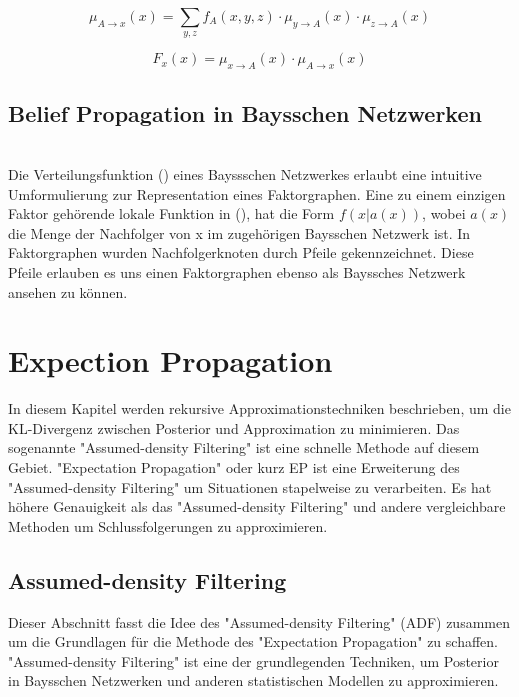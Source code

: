 \documentclass[12pt,a4paper]{scrartcl}
\numberwithin{equation}{section}
\begin{document}
\begin{equation}
 \mu_{A \rightarrow x}(x) = \sum_{y,z} f_A(x,y,z) \cdot \mu_{y \rightarrow A}(x) \cdot \mu_{z \rightarrow A}(x)
\end{equation}

\begin{equation}
 F_x(x) = \mu_{x \rightarrow A}(x) \cdot \mu_{A \rightarrow x}(x)
\end{equation}

\subsection{Belief Propagation in Baysschen Netzwerken}

\\
Die Verteilungsfunktion () eines Bayssschen Netzwerkes erlaubt eine intuitive Umformulierung zur Representation
eines Faktorgraphen. Eine zu einem einzigen Faktor gehörende lokale Funktion in (), hat die Form $f(x|a(x))$, wobei $a(x)$ die Menge der
Nachfolger von x im zugehörigen Baysschen Netzwerk ist. In Faktorgraphen wurden Nachfolgerknoten durch Pfeile gekennzeichnet.
Diese Pfeile erlauben es uns einen Faktorgraphen ebenso als Bayssches Netzwerk ansehen zu können.


 \newpage  %

\section{Expection Propagation}
In diesem Kapitel werden rekursive Approximationstechniken beschrieben, um die KL-Divergenz zwischen Posterior und Approximation 
zu minimieren. Das sogenannte "Assumed-density Filtering" ist eine schnelle Methode auf diesem Gebiet. "Expectation Propagation" oder kurz
EP ist eine Erweiterung des "Assumed-density Filtering" um Situationen stapelweise zu verarbeiten. Es hat höhere Genauigkeit als
das "Assumed-density Filtering" und andere vergleichbare Methoden um Schlussfolgerungen zu approximieren. 

\subsection{Assumed-density Filtering}

Dieser Abschnitt fasst die Idee des "Assumed-density Filtering" (ADF) zusammen um die Grundlagen für die Methode des "Expectation Propagation" zu
schaffen. "Assumed-density Filtering" ist eine der grundlegenden Techniken, um Posterior in Baysschen Netzwerken und anderen
statistischen Modellen zu approximieren. \\
\end{document}
